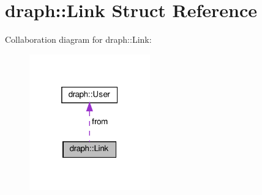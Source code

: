 \hypertarget{structdraph_1_1Link}{}\section{draph\+:\+:Link Struct Reference}
\label{structdraph_1_1Link}


Collaboration diagram for draph\+:\+:Link\+:\nopagebreak
\begin{figure}[H]
\begin{center}
\leavevmode
\includegraphics[width=148pt]{structdraph_1_1Link__coll__graph}
\end{center}
\end{figure}
